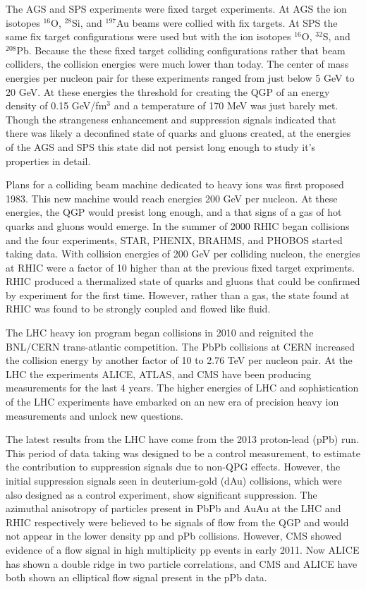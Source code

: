   The AGS and SPS experiments were fixed target experiments.
  At AGS the ion isotopes $^{16}$O, $^{28}$Si, and $^{197}$Au beams were 
    collied with fix targets. 
  At SPS the same fix target configurations were used but with the ion 
    isotopes $^{16}$O, $^{32}$S, and $^{208}$Pb.
  Because the these fixed target colliding configurations rather that beam
    colliders, the collision energies were much lower than today.
  The center of mass energies per nucleon pair for these experiments ranged
    from just below 5 GeV to 20 GeV. 
  At these energies the threshold for creating the QGP of an energy density 
    of 0.15 GeV/fm$^{3}$ and a temperature of 170 MeV was just barely 
    met.
  Though the strangeness enhancement and \JPsi{} suppression 
    signals indicated that there was likely a deconfined state of quarks 
    and gluons created, at the energies of the AGS and SPS this state did
    not persist long enough to study it's properties in detail. 

  Plans for a colliding beam machine dedicated to heavy ions was first 
    proposed 1983.
  This new machine would reach energies 200 GeV per nucleon.
  At these energies, the QGP would presist long enough, and a that signs of
    a gas of hot quarks and gluons would emerge.
  In the summer of 2000 RHIC began collisions and the four experiments,
    STAR, PHENIX, BRAHMS, and PHOBOS started taking data. 
  With collision energies of 200 GeV per colliding nucleon, the energies 
    at RHIC were a factor of 10 higher than at the previous fixed target 
    expriments. 
  RHIC produced a thermalized state of quarks and gluons that could be 
    confirmed by experiment for the first time. 
  However, rather than a gas, the state found at RHIC was found to be 
    strongly coupled and flowed like fluid.

  The LHC heavy ion program began collisions in 2010 and reignited the 
    BNL/CERN trans-atlantic competition. 
  The PbPb collisions at CERN increased the collision energy by another 
    factor of 10 to 2.76 TeV per nucleon pair. 
  At the LHC the experiments ALICE, ATLAS, and CMS have been producing 
    measurements for the last 4 years. 
  The higher energies of LHC and sophistication of the LHC experiments have
    embarked on an new era of precision heavy ion measurements and unlock
    new questions.

  The latest results from the LHC have come from the 2013 proton-lead (pPb)
    run.
  This period of data taking was designed to be a control measurement, to 
    estimate the contribution to suppression signals due to non-QPG effects.
  However, the initial \JPsi{} suppression signals seen in deuterium-gold (dAu) 
    collisions, which were also designed as a control experiment, show 
    significant suppression. 
  The azimuthal anisotropy of particles present in PbPb and AuAu at the LHC and 
    RHIC respectively were believed to be signals of flow from the QGP and 
    would not appear in the lower density pp and pPb collisions.
  However, CMS showed evidence of a flow signal in high multiplicity pp events
    in early 2011. 
  Now ALICE has shown a double ridge in two particle correlations, and CMS and
    ALICE have both shown an elliptical flow signal present in the pPb data.

